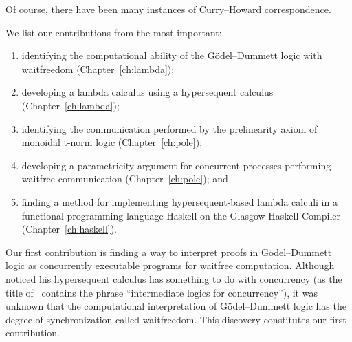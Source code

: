 Of course, there have been many instances of Curry--Howard correspondence.

We list our contributions from the most important: 
\begin{enumerate}
 \item identifying the computational ability of the
G\"odel--Dummett logic with waitfreedom (Chapter~\ref{ch:lambda});
 \item developing a lambda calculus using
       a hypersequent calculus (Chapter~\ref{ch:lambda});
 \item identifying the communication performed by the prelinearity axiom
       of monoidal t-norm logic (Chapter~\ref{ch:pole});
 \item developing a parametricity argument for
       concurrent processes performing waitfree communication
       (Chapter~\ref{ch:pole}); and
 \item finding a method for implementing hypersequent-based lambda calculi in a
       functional programming language Haskell on the Glasgow Haskell
       Compiler (Chapter~\ref{ch:haskell}).
\end{enumerate}

Our first contribution is finding a way to interpret proofs in
G\"odel--Dummett logic as
concurrently executable programs for waitfree computation.
Although \citet{avron91} noticed his hypersequent calculus has something
to do with concurrency (as the title of~\citep{avron91} contains the phrase
``intermediate logics for concurrency''), it was unknown that
the computational interpretation of G\"odel--Dummett logic has
the degree of synchronization called waitfreedom.  This discovery
constitutes our first contribution.


